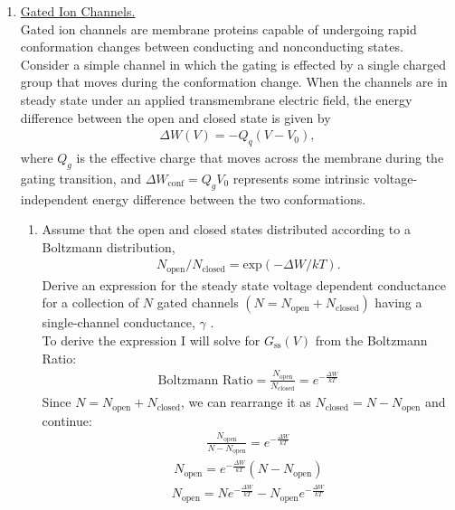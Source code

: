 \documentclass[11pt]{article}
\begin{document}
\begin{enumerate}[label=\arabic*.]
\newpage
\item
\underline{Gated Ion Channels.}
\vspace*{1\baselineskip}
\\
Gated ion channels are membrane proteins capable of undergoing rapid conformation changes between conducting and nonconducting states. Consider a simple channel in which the gating is effected by a single charged group that moves during the conformation change. When the channels are in steady state under an applied transmembrane electric field, the energy difference between the open and closed state is given by
\begin{align*}
\Delta W(V) = -Q_q(V - V_0),
\end{align*}
where $Q_g$ is the effective charge that moves across the membrane during the gating transition, and $\Delta W_{\text{conf}} = Q_g V_0$ represents some intrinsic voltage-independent energy difference between the two conformations.
\begin{enumerate}[label=(\alph*)]
\item
Assume that the open and closed states distributed according to a Boltzmann distribution,
\begin{align*}
N_{\text{open}} / N_{\text{closed}} = \text{exp}(-\Delta W / k T).
\end{align*}
Derive an expression for the steady state voltage dependent conductance for a collection of $N$ gated channels $\left(N = N_{\text{open}} + N_{\text{closed}}\right)$ having a single-channel conductance, $\gamma$ .
\vspace*{1\baselineskip}
\\
To derive the expression I will solve for $G_{\text{ss}}(V)$ from the Boltzmann Ratio:
\begin{align*}
\text{Boltzmann Ratio} = \frac{N_{\text{open}}} {N_{\text{closed}}} = e ^ {- \frac{\Delta W} {k T}}
\end{align*}
Since $N = N_{\text{open}} + N_{\text{closed}}$, we can rearrange it as $N_{\text{closed}} = N - N_{\text{open}}$ and continue:
\begin{align*}
\frac{N_{\text{open}}} {N - N_{\text{open}}} = e ^ {- \frac{\Delta W} {k T}}
\end{align*}
\begin{align*}
N_{\text{open}} = e ^ {- \frac{\Delta W} {k T}} \left(N - N_{\text{open}}\right)
\end{align*}
\begin{align*}
N_{\text{open}} = Ne ^ {- \frac{\Delta W} {k T}} - N_{\text{open}} e ^ {- \frac{\Delta W} {k T}}

\end{align*}
\end{enumerate}
\end{enumerate}
\end{document}
